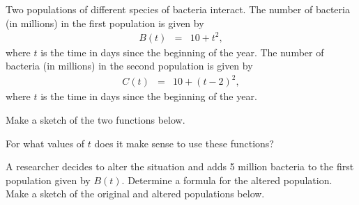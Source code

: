 
\begin{problem}
\item Two populations of different species of bacteria interact. The
  number of bacteria (in millions) in the first population is given by
  \begin{eqnarray*}
    B(t) & = & 10 + t^2,
  \end{eqnarray*}
  where $t$ is the time in days since the beginning of the year.  The
  number of bacteria (in millions) in the second population is given by
  \begin{eqnarray*}
    C(t) & = & 10+(t-2)^2,
  \end{eqnarray*}
  where $t$ is the time in days since the beginning of the year.
  \begin{subproblem}
  \item Make a sketch of the two functions below.
    \vfill
  \item For what values of $t$ does it make sense to use these functions?
    \vfill
  \item A researcher decides to alter the situation and adds 5 million
    bacteria to the first population given by $B(t)$. Determine a
    formula for the altered population. Make a sketch of the original
    and altered populations below.
    \vfill
  \end{subproblem}

\end{problem}


